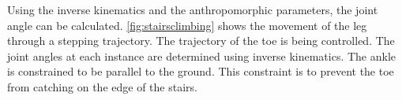 

Using the inverse kinematics and the anthropomorphic parameters, the joint angle can be calculated. \autoref{fig:stairsclimbing} shows the movement of the leg through a stepping trajectory. The trajectory of the toe is being controlled. The joint angles at each instance are determined using inverse kinematics. The ankle is constrained to be parallel to the ground. This constraint is to prevent the toe from catching on the edge of the stairs.



